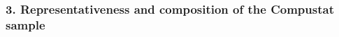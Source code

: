 \documentclass{amsart}
\theoremstyle{definition}
\theoremstyle{remark}
\numberwithin{equation}{section}
\begin{document}






\subsubsection*{3. Representativeness and composition of the Compustat sample} 
\end{document}
